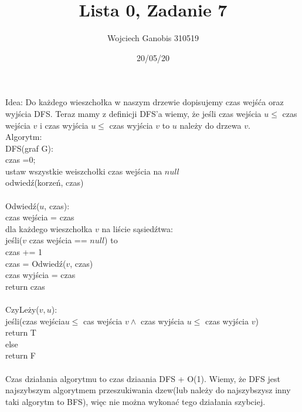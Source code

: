 \documentclass{article}
\title{Lista 0, Zadanie 7}
\author{Wojciech Ganobis 310519}
\date{20/05/20}
\newcommand\tab[1][1cm]{\hspace*{#1}}
\begin{document}
\maketitle

Idea: Do każdego wieszchołka w naszym drzewie dopisujemy czas wejśća oraz wyjścia DFS. Teraz mamy z definicji DFS'a wiemy, że jeśli czas wejścia $u \leq$ czas wejścia $v$ i czas wyjścia $u \leq$ czas wyjścia $v$ to $u$ należy do drzewa $v$.\\

Algorytm:\\

DFS(graf G):\\
\tab	czas =0;\\
\tab	ustaw wszystkie weiszchołki czas wejścia na $null$\\
\tab	odwiedź(korzeń, czas)\\
\\
Odwiedź($u$, czas):\\
\tab	czas wejścia = czas\\
\tab	dla każdego wieszchołka $v$ na liście sąsiedźtwa:\\
\tab\tab		jeśli($v$ czas wejścia == $null$) to\\
\tab\tab\tab			czas += 1\\
\tab\tab\tab			czas = Odwiedź($v$, czas)\\
\tab\tab	czas wyjścia = czas\\
\tab	return czas\\
\\
CzyLeży($v, u$):\\
\tab	jeśli(czas wejścia$u \leq$ cas wejścia $v \wedge$ czas wyjścia $u \leq$ czas wyjścia $v$)\\
\tab\tab		return T\\
\tab	else\\
\tab\tab		return F\\
\\

Czas działania algorytmu to czas dziaania DFS + O(1). Wiemy, że DFS jest najszybszym algorytmem przeszukiwania dzew(lub należy do najszybszysz inny taki algorytm to BFS), więc nie można wykonać tego działania szybciej.
\end{document}

